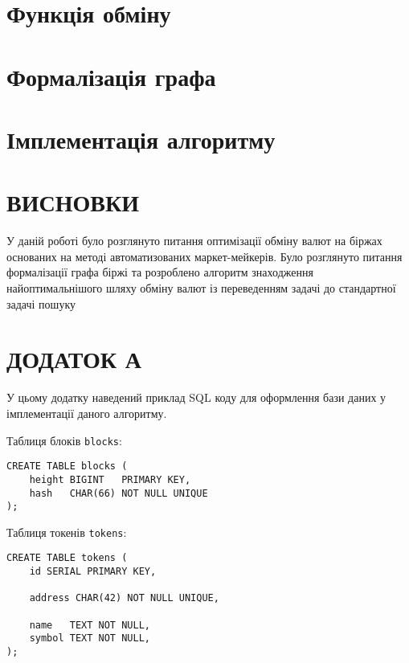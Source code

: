 \documentclass[14pt]{extarticle}
\begin{document}
\section{Функція обміну}\label{sec:swap-function}


\newpage

\section{Формалізація графа}\label{sec:graph}


\newpage

\section{Імплементація алгоритму}\label{sec:algorithm-impl}


\newpage

\section{ВИСНОВКИ}

У даній роботі було розглянуто питання оптимізації обміну валют на біржах
основаних на методі автоматизованих маркет-мейкерів. Було розглянуто питання
формалізації графа біржі та розроблено алгоритм знаходження найоптимальнішого
шляху обміну валют із переведенням задачі до стандартної задачі пошуку

\newpage

\printbibliography{}
\newpage

\section{ДОДАТОК А}\label{sec:addition-a}

У цьому додатку наведений приклад SQL коду для оформлення бази даних у
імплементації даного алгоритму.

Таблиця блоків \texttt{blocks}:

\begin{verbatim}
CREATE TABLE blocks (
    height BIGINT   PRIMARY KEY,
    hash   CHAR(66) NOT NULL UNIQUE
);
\end{verbatim}

Таблиця токенів \texttt{tokens}:

\begin{verbatim}
CREATE TABLE tokens (
    id SERIAL PRIMARY KEY,

    address CHAR(42) NOT NULL UNIQUE,

    name   TEXT NOT NULL,
    symbol TEXT NOT NULL,
);
\end{verbatim}
\end{document}
